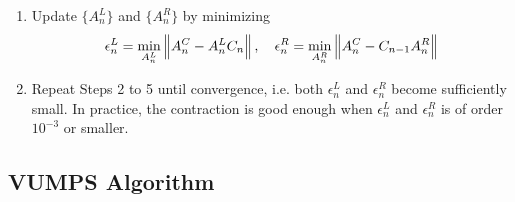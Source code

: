 \documentclass[11pt]{article}
\begin{document}
\begin{enumerate}
    \item Update $\{A^L_n\}$ and $\{A^R_n\}$ by minimizing
    \begin{equation}
        \epsilon^L_n = \min_{A^L_n} \left\lVert A^C_n - A^L_n C_n \right\rVert, \quad
        \epsilon^R_n = \min_{A^R_n} \left\lVert A^C_n - C_{n-1} A^R_n \right\rVert
    \end{equation}

    \item Repeat Steps 2 to 5 until convergence, i.e. both $\epsilon^L_n$ and $\epsilon^R_n$ become sufficiently small. In practice, the contraction is good enough when $\epsilon^L_n$ and $\epsilon^R_n$ is of order $10^{-3}$ or smaller. 
\end{enumerate}

\subsection{VUMPS Algorithm}
\begingroup
\newcommand{\drawlinesACC}{
    \contrRa{-2.5}{-1.5}{-0.5}
    \contrLa{-2.5}{-1.5}{0.5}
    \lineHa{-1}{-0.5}{-2.5}
    \lineHa{1}{0.5}{-2.5}
}
\newcommand{\fourlegsA}[3]{
    \lineHa{#1+0.5}{#1+0.5+#3}{#2}
    \lineHa{#1-0.5-#3}{#1-0.5}{#2}
    \lineVa{#2+0.5}{#2+0.5+#3}{#1}
    \lineVa{#2-0.5-#3}{#2-0.5}{#1}
}
\newcommand{\uniformRow}[2]{
    \foreach \x in {-1.5,0,1.5} {
        \fourlegsA{\x}{#1}{0.5} \tensor{\x}{#1}{#2}
    }
}
\newcommand{\uniformCol}[2]{
    \foreach \y in {-1.5,0,1.5} {
        \fourlegsA{#1}{\y}{0.5} \tensor{#1}{\y}{#2}
    }
}
\newcommand{\sitelabels}{
    \foreach \y/\mylabel in {1.5/y+1, 0/y, -1.5/y-1}
    {\draw (-3.5,\y) node {$\mylabel$};}
    \foreach \x/\mylabel in {1.5/x+1, 0/x, -1.5/x-1}
    {\draw (\x,-3) node {$\mylabel$};}
}
\newcommand{\sitelabelsXdots}[1]{
    \draw (-2.5,#1) node {$\cdots$};
    \draw (2.5,#1) node {$\cdots$};
}
\newcommand{\sitelabelsYdots}[1]{
    \draw (#1,2.5) node {$\vdots$};
    \draw (#1,-2.5) node {$\vdots$};
}
\end{document}
